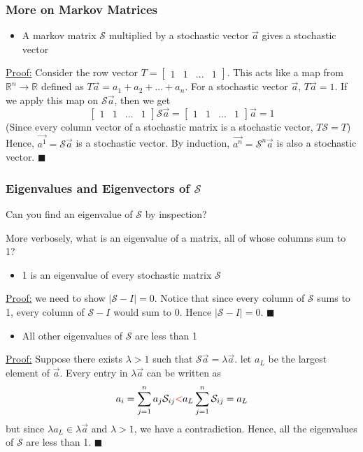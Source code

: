 \documentclass{beamer}
\begin{document}
\begin{frame}[t]\frametitle{More on Markov Matrices}
\begin{itemize}
	\item A markov matrix $\mathcal{S}$ multiplied by a stochastic vector $\vec{a}$ gives a stochastic vector
\end{itemize}
\underline{Proof:} Consider the row vector $T = \begin{bmatrix} 1 & 1 & ... & 1 \end{bmatrix}$.
This acts like a map from $\mathbb{R}^n \to \mathbb{R}$ defined as $T\vec{a} = a_1 + a_2 + ... + a_n$.
For a stochastic vector $\vec{a}$, $T\vec{a} = 1$. If we apply this map on $\mathcal{S}\vec{a}$, 
then we get 
$$\begin{bmatrix} 1 & 1 & ... & 1 \end{bmatrix} \mathcal{S} \vec{a} = \begin{bmatrix} 1 & 1 & ... & 1 \end{bmatrix} \vec{a} = 1$$
(Since every column vector of a stochastic matrix is a stochastic vector, 
$T\mathcal{S} = T$) \\
\vspace{2em}
Hence, $\vec{a^1} = \mathcal{S}\vec{a}$ is a stochastic vector. By induction, 
$\vec{a^n} = \mathcal{S}^n\vec{a}$ is also a stochastic vector. $\blacksquare$
\end{frame}

\begin{frame}[t]\frametitle{Eigenvalues and Eigenvectors of $\mathcal{S}$}
\pause
\begin{center}{\color{red}Can you find an eigenvalue of $\mathcal{S}$ by inspection?}\end{center}
More verbosely, what is an eigenvalue of a matrix, all of whose columns sum to 1?
\pause
\begin{itemize}
	\item 1 is an eigenvalue of every stochastic matrix $\mathcal{S}$
\end{itemize}
\underline{Proof:} we need to show $|\mathcal{S} - I| = 0$. Notice that since every column
of $\mathcal{S}$ sums to 1, every column of $\mathcal{S} - I$ would sum to 0. 
Hence $|\mathcal{S} - I| = 0$. $\blacksquare$\\
\vspace{1em}
\begin{itemize}
	\item All other eigenvalues of $\mathcal{S}$ are less than 1
\end{itemize}
\underline{Proof:} Suppose there exists $\lambda > 1$ such that $\mathcal{S}\vec{a} = \lambda \vec{a}$.
let $a_L$ be the largest element of $\vec{a}$. Every entry in $\lambda\vec{a}$ can be written as 
$$a_i = \sum_{j=1}^n a_j\mathcal{S}_{ij} {\color{red}<} a_L \sum_{j=1}^n \mathcal{S}_{ij} = a_L$$
but since $\lambda a_L \in \lambda\vec{a}$ and $\lambda > 1$, we have a contradiction.
Hence, all the eigenvalues of $\mathcal{S}$ are less than 1. $\blacksquare$

\end{frame}
\end{document}
